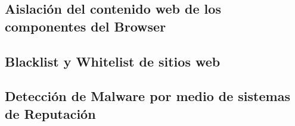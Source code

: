 
 \subsection{Aislación del contenido web de los componentes del Browser}

 \subsection{Blacklist y Whitelist de sitios web}

 \subsection{Detección de Malware por medio de sistemas de Reputación}

